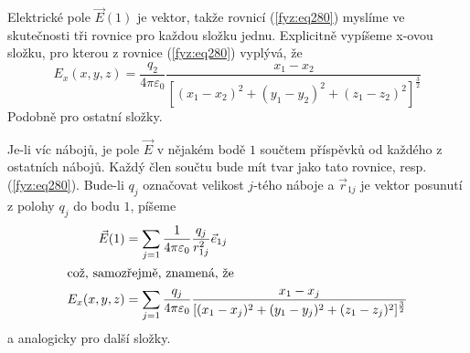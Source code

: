 {    Elektrické pole \(\vec{E}(1)\) je vektor, takže rovnicí (\ref{fyz:eq280}) myslíme ve 
    skutečnosti tři rovnice pro  každou složku jednu. Explicitně vypíšeme x-ovou složku, pro kterou 
    z rovnice (\ref{fyz:eq280}) vyplývá, že
    \begin{equation*}             %
      E_x(x,y,z) = \frac{q_2}{4\pi\varepsilon_0}
                   \frac{x_1-x_2}{[(x_1-x_2)^2+(y_1-y_2)^2+(z_1-z_2)^2]^{\frac{3}{2}}}
    \end{equation*}
    Podobně pro ostatní složky.
     
    Je-li víc nábojů, je pole \(\vec{E}\) v nějakém bodě \(1\) součtem příspěvků od každého z 
    ostatních nábojů. Každý člen součtu bude mít tvar jako tato rovnice, resp. 
    (\ref{fyz:eq280}). Bude-li \(q_j\) označovat velikost \(j\)-tého náboje a  
    \(\vec{r}_{1j}\) je vektor posunutí z polohy 
    \(q_j\) do bodu \(1\), píšeme
    \begin{align}
      \vec{E}(1) &= \sum\limits_{j=1}\frac{1}{4\pi\varepsilon_0}\frac{q_j}{r^2_{1j}}\vec{e}_{1j}
                    \label{fyz:eq276}    \\
      \shortintertext{což, samozřejmě, znamená, že}
      E_x(x,y,z) &= \sum\limits_{j=1}\frac{q_j}{4\pi\varepsilon_0}
                    \frac{x_1-x_j}{[(x_1-x_j)^2+(y_1-y_j)^2+(z_1-z_j)^2]^{\frac{3}{2}}} 
                                         \nonumber  
    \end{align}     
    a analogicky pro další složky.
    
}
